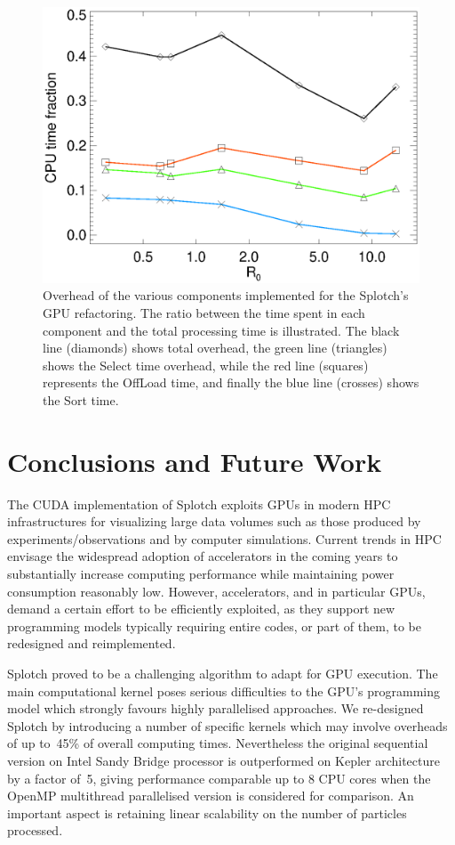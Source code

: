 \documentclass[preprint,5pt]{elsarticle}
\begin{document}
\begin{figure}
\centering
\includegraphics[scale=0.5]{overheadsK20-fig9.eps}
\caption{Overhead of the various components implemented for the Splotch's
GPU refactoring. The ratio between the time spent in each component and the total processing 
time is illustrated. The black line (diamonds) shows total overhead, the green line (triangles) shows the Select time overhead, while the red line (squares) represents the OffLoad time, and finally the blue line (crosses) shows the Sort time.}
\label{fig:over}
\end{figure}

\section{Conclusions and Future Work}
\label{sec:conclusions}
The CUDA implementation of Splotch exploits GPUs in modern HPC infrastructures for visualizing large data volumes such as those produced by experiments/observations and by computer simulations. Current trends in HPC envisage the widespread adoption of accelerators in the coming years to substantially increase computing performance while maintaining power consumption reasonably low. However, accelerators, and in particular GPUs, demand a certain effort to be efficiently exploited, as they support new programming models typically requiring entire codes, or part of them, to be redesigned and reimplemented.

Splotch proved to be a challenging algorithm to adapt for GPU execution. The main computational kernel poses serious difficulties to the GPU's programming model which strongly favours highly parallelised approaches. We re-designed Splotch by introducing a number of specific kernels which may involve overheads of up to~45\% of overall computing times. Nevertheless the original sequential 
version on Intel Sandy Bridge processor is outperformed on Kepler architecture by a factor of~5, giving performance comparable up to 8 CPU cores when the OpenMP multithread parallelised version is considered for comparison. An important aspect is retaining linear scalability on the number of particles processed.
\end{document}
